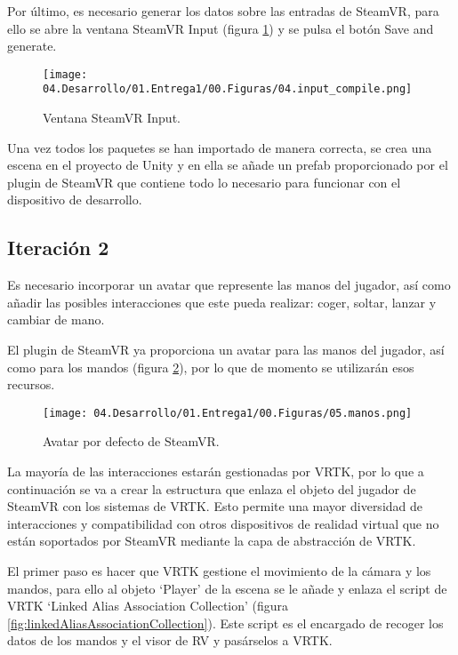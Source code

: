 Por último, es necesario generar los datos sobre las entradas de SteamVR, para ello se abre la ventana SteamVR Input (figura \ref{fig:inputCompile}) y se pulsa el botón Save and generate.

\begin{figure}
  \centering
    \texttt{[image: 04.Desarrollo/01.Entrega1/00.Figuras/04.input\_compile.png]}
    \caption{Ventana SteamVR Input.}
    \label{fig:inputCompile}
\end{figure}

Una vez todos los paquetes se han importado de manera correcta, se crea una escena en el proyecto de Unity y en ella se añade un prefab proporcionado por el plugin de SteamVR que contiene todo lo necesario para funcionar con el dispositivo de desarrollo.



\subsection{Iteración 2}

Es necesario incorporar un avatar que represente las manos del jugador, así como añadir las posibles interacciones que este pueda realizar: coger, soltar, lanzar y cambiar de mano.

El plugin de SteamVR ya proporciona un avatar para las manos del jugador, así como para los mandos (figura \ref{fig:manos}), por lo que de momento se utilizarán esos recursos. 

\begin{figure}
  \centering
    \texttt{[image: 04.Desarrollo/01.Entrega1/00.Figuras/05.manos.png]}
    \caption{Avatar por defecto de SteamVR.}
    \label{fig:manos}
\end{figure}


La mayoría de las interacciones estarán gestionadas por VRTK, por lo que a continuación se va a crear la estructura que enlaza el objeto del jugador de SteamVR con los sistemas de VRTK. Esto permite una mayor diversidad de interacciones y compatibilidad con otros dispositivos de realidad virtual que no están soportados por SteamVR mediante la capa de abstracción de VRTK.

El primer paso es hacer que VRTK gestione el movimiento de la cámara y los mandos, para ello al objeto ‘Player’ de la escena se le añade y enlaza el script de VRTK ‘Linked Alias Association Collection’ (figura \ref{fig:linkedAliasAssociationCollection}). Este script es el encargado de recoger los datos de los mandos y el visor de RV y pasárselos a VRTK.

